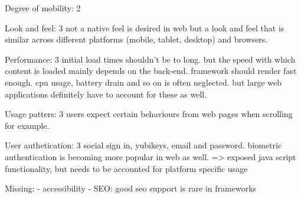 Degree of mobility:
2

Look and feel:
3
not a native feel is desired in web but a look and feel that is similar across different platforms (mobile, tablet, desktop) and browsers.

Performance:
3
initial load times shouldn't be to long. but the speed with which content is loaded mainly depends on the back-end.
framework should render fast enough.
cpu usage, battery drain and so on is often neglected. but large web applications definitely have to account for these as well.

Usage patters:
3
users expect certain behaviours from web pages when scrolling for example. 

User authetication:
3
social sign in, yubikeys, email and password. 
biometric authentication is becoming more popular in web as well. 
=> exposed java script functionality, but needs to be accounted for platform specific usage

Missing:
- accessibility
- SEO: good seo support is rare in frameworks










